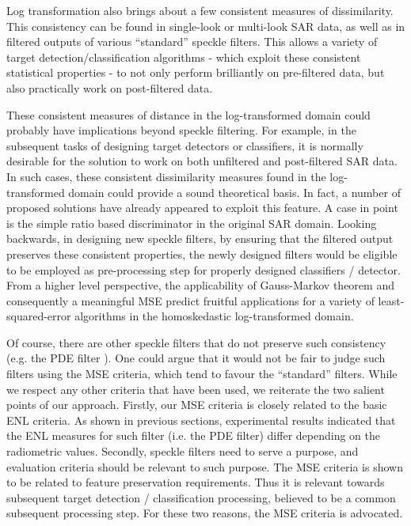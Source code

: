 Log transformation also brings about a few consistent measures of dissimilarity.
	This consistency can be found in single-look or multi-look SAR data, 
	as well as in filtered outputs of various ``standard'' speckle filters.
This allows a variety of target detection/classification algorithms
  - which exploit these consistent statistical properties -
  to not only perform brilliantly on pre-filtered data,
  but also practically work on post-filtered data.
        
These consistent measures of distance in the log-transformed domain could probably have implications beyond speckle filtering.
For example, in the subsequent tasks of designing target detectors or classifiers,
  it is normally desirable for the solution to work on both unfiltered and post-filtered SAR data.
In such cases, these consistent dissimilarity measures found in the log-transformed domain could provide a sound theoretical
	basis. In fact, a number of proposed solutions have already appeared to exploit this feature. 
A case in point is the simple ratio based discriminator in the original SAR domain.
Looking backwards, in designing new speckle filters,
  by ensuring that the filtered output preserves these consistent properties,
	the newly designed filters would be eligible to be employed as pre-processing step for properly designed classifiers / detector.
From a higher level perspective, the applicability of Gauss-Markov theorem and consequently a meaningful MSE 
  predict fruitful applications for a variety of least-squared-error algorithms in the homoskedastic log-transformed domain.
        
Of course, there are other speckle filters that do not preserve such consistency 
	(e.g. the PDE filter \cite{You_TIP_2000}). One could argue that it would not be fair to judge such filters 
	using the MSE criteria, which tend to favour the ``standard'' filters.
While we respect any other criteria that have been used, we reiterate the two salient points of our approach. 
Firstly, our MSE criteria is closely related to the basic ENL criteria.
As shown in previous sections, experimental results indicated that
  the ENL measures for such filter (i.e. the PDE filter) differ depending  on the radiometric values. 
Secondly, speckle filters need to serve a purpose, and evaluation criteria should be relevant to such purpose.
The MSE criteria is shown to be related to feature preservation requirements.
Thus it is relevant towards subsequent target detection / classification processing, 
	believed to be a common subsequent processing step. 
For these two reasons, the MSE criteria is advocated.

